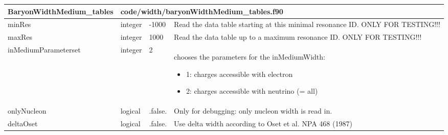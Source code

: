 \documentclass{article}
\begin{document}
\begin{longtable}{llll}
\toprule
\textbf{\large{BaryonWidthMedium\_tables}} & \multicolumn{3}{l}{\footnotesize{code/width/baryonWidthMedium\_tables.f90}}\\*
\midrule
\endfirsthead
\midrule
\endhead
minRes & \begin{minipage}[t]{2cm}integer\end{minipage} & \begin{minipage}[t]{2cm}-1000\end{minipage} & \begin{minipage}[t]{12cm}Read the data table starting at this minimal resonance ID. ONLY FOR TESTING!!!\end{minipage}\\*
\midrule
maxRes & \begin{minipage}[t]{2cm}integer\end{minipage} & \begin{minipage}[t]{2cm}1000\end{minipage} & \begin{minipage}[t]{12cm}Read the data table up to a maximum resonance ID. ONLY FOR TESTING!!!\end{minipage}\\*
\midrule
inMediumParameterset & \begin{minipage}[t]{2cm}integer\end{minipage} & \begin{minipage}[t]{2cm}2\end{minipage} & \begin{minipage}[t]{12cm}chooses the parameters for the inMediumWidth:\begin{itemize}\leftmargin0em\itemindent0pt\item 1: charges accessible with electron\item 2: charges accessible with neutrino (= all)\end{itemize}\end{minipage}\\*
\midrule
onlyNucleon & \begin{minipage}[t]{2cm}logical\end{minipage} & \begin{minipage}[t]{2cm}.false.\end{minipage} & \begin{minipage}[t]{12cm}Only for debugging: only nucleon width is read in.\end{minipage}\\*
\midrule
deltaOset & \begin{minipage}[t]{2cm}logical\end{minipage} & \begin{minipage}[t]{2cm}.false.\end{minipage} & \begin{minipage}[t]{12cm}Use delta width according to Oset et al. NPA 468 (1987)\end{minipage}\\*

\end{longtable}
\end{document}

